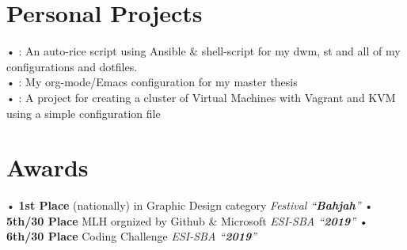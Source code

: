 \documentclass{cv}
\begin{document}
\section{Personal Projects}
      • : An auto-rice script using Ansible \& shell-script for my dwm, st and all of my configurations and dotfiles.\\
      • : My org-mode/Emacs configuration for my master thesis\\
      • : A project for creating a cluster of Virtual Machines with Vagrant and KVM using a simple configuration file

\section{Awards}
  • \textbf{1st Place} (nationally) in  Graphic Design category \emph{Festival ``\textbf{Bahjah}''} 
  • \textbf{5th/30 Place} MLH orgnized by Github \& Microsoft \emph{ESI-SBA ``\textbf{2019}''} 
  • \textbf{6th/30 Place} Coding Challenge \emph{ESI-SBA ``\textbf{2019}''}
\end{document}
